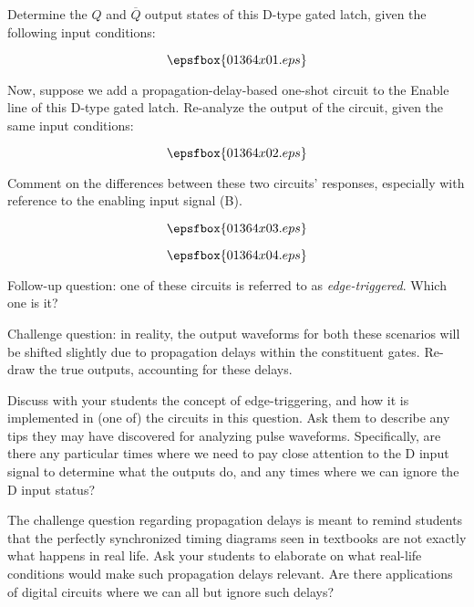

Determine the $Q$ and $\overline{Q}$ output states of this D-type gated latch, given the following input conditions:

$$\epsfbox{01364x01.eps}$$

Now, suppose we add a propagation-delay-based one-shot circuit to the Enable line of this D-type gated latch.  Re-analyze the output of the circuit, given the same input conditions:

$$\epsfbox{01364x02.eps}$$

Comment on the differences between these two circuits' responses, especially with reference to the enabling input signal (B).







$$\epsfbox{01364x03.eps}$$

\vskip 20pt

$$\epsfbox{01364x04.eps}$$

\vskip 10pt

Follow-up question: one of these circuits is referred to as {\it edge-triggered}.  Which one is it?

\vskip 10pt

Challenge question: in reality, the output waveforms for both these scenarios will be shifted slightly due to propagation delays within the constituent gates.  Re-draw the true outputs, accounting for these delays.







Discuss with your students the concept of edge-triggering, and how it is implemented in (one of) the circuits in this question.  Ask them to describe any tips they may have discovered for analyzing pulse waveforms.  Specifically, are there any particular times where we need to pay close attention to the D input signal to determine what the outputs do, and any times where we can ignore the D input status?

The challenge question regarding propagation delays is meant to remind students that the perfectly synchronized timing diagrams seen in textbooks are not exactly what happens in real life.  Ask your students to elaborate on what real-life conditions would make such propagation delays relevant.  Are there applications of digital circuits where we can all but ignore such delays?





